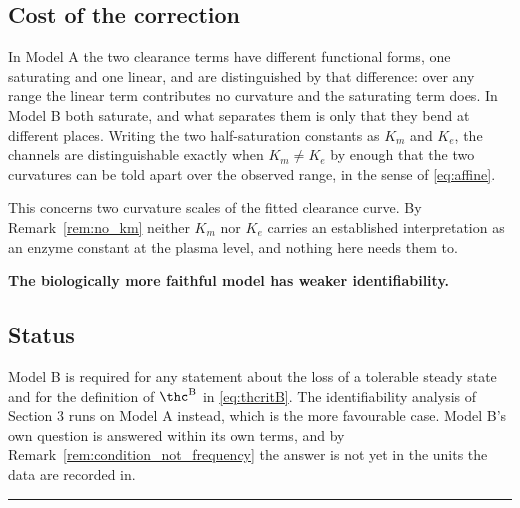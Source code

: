 \subsection{Cost of the correction}

In Model A the two clearance terms have different functional forms, one saturating and one
linear, and are distinguished by that difference: over any range the linear term
contributes no curvature and the saturating term does. In Model B both saturate, and what
separates them is only that they bend at different places. Writing the two half-saturation
constants as $K_m$ and $K_e$, the channels are distinguishable exactly when
$K_m \neq K_e$ by enough that the two curvatures can be told apart over the observed range,
in the sense of \eqref{eq:affine}.

This concerns two curvature scales of the fitted clearance curve. By
Remark~\ref{rem:no_km} neither $K_m$ nor $K_e$ carries an established interpretation as an
enzyme constant at the plasma level, and nothing here needs them to.

\textbf{The biologically more faithful model has weaker identifiability.}

\subsection{Status}

Model B is required for any statement about the loss of a tolerable steady state and for
the definition of $\thc^{\mathrm{B}}$ in \eqref{eq:thcritB}. The identifiability analysis of Section 3
runs on Model A instead, which is the more favourable case. Model B's own question is
answered within its own terms, and by Remark~\ref{rem:condition_not_frequency} the answer is
not yet in the units the data are recorded in.

\vspace{0.5em}
\hrule
\vspace{1em}

